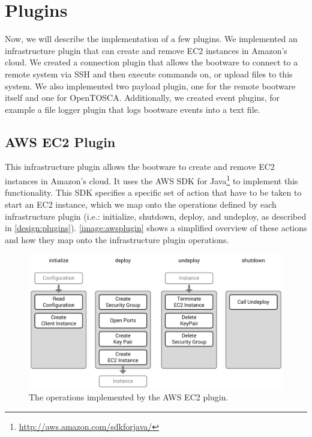 \section{Plugins}
\label{implementation:plugins}

Now, we will describe the implementation of a few plugins.
We implemented an infrastructure plugin that can create and remove EC2 instances in Amazon's cloud.
We created a connection plugin that allows the bootware to connect to a remote system via SSH and then execute commands on, or upload files to this system.
We also implemented two payload plugin, one for the remote bootware itself and one for OpenTOSCA.
Additionally, we created event plugins, for example a file logger plugin that logs bootware events into a text file.

\subsection{AWS EC2 Plugin}

This infrastructure plugin allows the bootware to create and remove EC2 instances in Amazon's cloud.
It uses the AWS SDK for Java\footnote{\url{http://aws.amazon.com/sdkforjava/}} to implement this functionality.
This SDK specifies a specific set of action that have to be taken to start an EC2 instance, which we map onto the operations defined by each infrastructure plugin (i.e.: initialize, shutdown, deploy, and undeploy, as described in \autoref{design:plugins}).
\autoref{image:awsplugin} shows a simplified overview of these actions and how they map onto the infrastructure plugin operations.

\begin{figure}[!htbp]
	\centering
	\includegraphics[resolution=600]{implementation/assets/aws_plugin}
	\caption{The operations implemented by the AWS EC2 plugin.}
	\label{image:awsplugin}
\end{figure}

